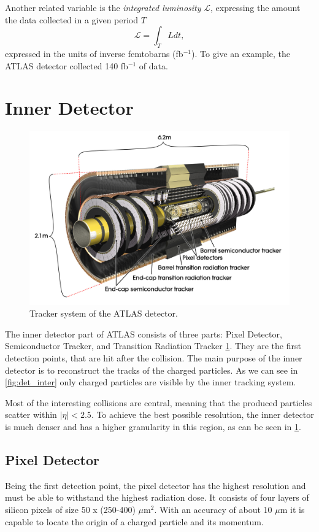 Another related variable is the \emph{integrated luminosity} $ \mathcal{L}$, expressing the amount the data collected in a given period $T$
\begin{equation}
    \mathcal{L} = \int_{T} L dt,
\end{equation}
expressed in the units of inverse femtobarns (fb$^{-1}$).
To give an example, the ATLAS detector collected 140 fb$^{-1}$ of data.




\section{Inner Detector}
\label{sec:trackers}
\begin{figure}[htb]
    \centering
    \includegraphics[width=1\linewidth]{src/img/track.jpg}
    \caption{Tracker system of the ATLAS detector.}
    \label{fig:tracker}
\end{figure}
The inner detector part of ATLAS consists of three parts: Pixel Detector, Semiconductor Tracker, and Transition Radiation Tracker \cref{fig:tracker}. 
They are the first detection points, that are hit after the collision.
The main purpose of the inner detector is to reconstruct the tracks of the charged particles.
As we can see in \cref{fig:det_inter} only charged particles are visible by the inner tracking system.

Most of the interesting collisions are central, meaning that the produced particles scatter within $|\eta| < 2.5$.
To achieve the best possible resolution, the inner detector is much denser and has a higher granularity in this region, as can be seen in \cref{fig:tracker}.

\subsection{Pixel Detector}
Being the first detection point, the pixel detector has the highest resolution and must be able to withstand the highest radiation dose.
It consists of four layers of silicon pixels of size 50 x (250-400) $\mu$m$^2$.
With an accuracy of about 10 $\mu$m it is capable to locate the origin of a charged particle and its momentum.

